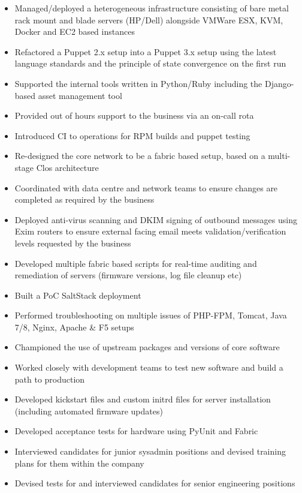 \begin{itemize}
\tightlist
\item
  Managed/deployed a heterogeneous infrastructure consisting of bare
  metal rack mount and blade servers (HP/Dell) alongside VMWare ESX,
  KVM, Docker and EC2 based instances
\item
  Refactored a Puppet 2.x setup into a Puppet 3.x setup using the latest
  language standards and the principle of state convergence on the first
  run
\item
  Supported the internal tools written in Python/Ruby including the
  Django-based asset management tool
\item
  Provided out of hours support to the business via an on-call rota
\item
  Introduced CI to operations for RPM builds and puppet testing
\item
  Re-designed the core network to be a fabric based setup, based on a
  multi-stage Clos architecture
\item
  Coordinated with data centre and network teams to ensure changes are
  completed as required by the business
\item
  Deployed anti-virus scanning and DKIM signing of outbound messages
  using Exim routers to ensure external facing email meets
  validation/verification levels requested by the business
\item
  Developed multiple fabric based scripts for real-time auditing and
  remediation of servers (firmware versions, log file cleanup etc)
\item
  Built a PoC SaltStack deployment
\item
  Performed troubleshooting on multiple issues of PHP-FPM, Tomcat, Java
  7/8, Nginx, Apache \& F5 setups
\item
  Championed the use of upstream packages and versions of core software
\item
  Worked closely with development teams to test new software and build a
  path to production
\item
  Developed kickstart files and custom initrd files for server
  installation (including automated firmware updates)
\item
  Developed acceptance tests for hardware using PyUnit and Fabric
\item
  Interviewed candidates for junior sysadmin positions and devised
  training plans for them within the company
\item
  Devised tests for and interviewed candidates for senior engineering
  positions
\end{itemize}

